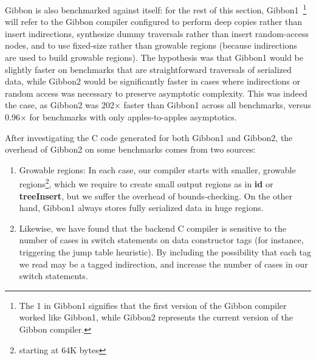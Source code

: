 Gibbon is also benchmarked against itself: for the rest of this section,
Gibbon1~\footnote{The 1 in Gibbon1 signifies that the first version of the
Gibbon compiler worked like Gibbon1, while Gibbon2 represents the current
version of the Gibbon compiler.} will refer to the Gibbon compiler configured to
perform deep copies rather than insert indirections, synthesize dummy traversals
rather than insert random-access nodes, and to use fixed-size rather than
growable regions (because indirections are used to build growable regions). The
hypothesis was that Gibbon1 would be slightly faster on benchmarks that are
straightforward traversals of serialized data, while Gibbon2 would be
significantly faster in cases where indirections or random access was necessary
to preserve asymptotic complexity. This was indeed the case, as Gibbon2 was
202$\times$ faster than Gibbon1 across all benchmarks, versus 0.96$\times$ for
benchmarks with only apples-to-apples asymptotics.





After investigating the C code generated for both Gibbon1 and Gibbon2,
the overhead of Gibbon2 on some benchmarks comes from two sources:
%
\begin{enumerate}
\item Growable regions: In each case, our compiler starts with smaller, growable
regions\footnote{starting at 64K bytes}, which we require to create small output
regions as in {\bf id} or {\bf treeInsert}, but we suffer the overhead of
bounds-checking. On the other hand, Gibbon1 always stores fully serialized data
in huge regions.

\item Likewise, we have found that the backend C compiler is sensitive to the
number of cases in switch statements on data constructor tags (for instance,
triggering the jump table heuristic). By including the possibility that each tag
we read may be a tagged indirection, %
and increase the number of cases in our switch statements.
\end{enumerate}


